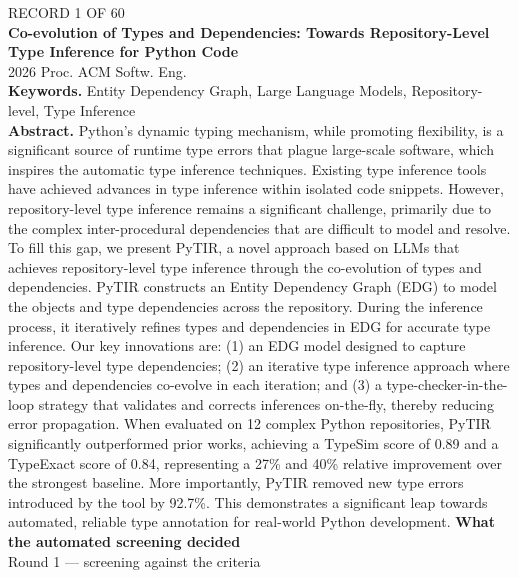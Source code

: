\documentclass[11pt,a4paper]{article}
\begin{document}
{\color{soft}\footnotesize RECORD 1 OF 60}\\[1mm]
{\large\bfseries Co-evolution of Types and Dependencies: Towards Repository-Level Type Inference for Python Code}\\[1.5mm]
{\color{soft}\small 2026 \textperiodcentered{} Proc. ACM Softw. Eng.}\\[2mm]
{\small\textbf{Keywords.} Entity Dependency Graph, Large Language Models, Repository-level, Type Inference}\\[2mm]
{\small\textbf{Abstract.} Python's dynamic typing mechanism, while promoting flexibility, is a significant source of runtime type errors that plague large-scale software, which inspires the automatic type inference techniques. Existing type inference tools have achieved advances in type inference within isolated code snippets. However, repository-level type inference remains a significant challenge, primarily due to the complex inter-procedural dependencies that are difficult to model and resolve. To fill this gap, we present PyTIR, a novel approach based on LLMs that achieves repository-level type inference through the co-evolution of types and dependencies. PyTIR constructs an Entity Dependency Graph (EDG) to model the objects and type dependencies across the repository. During the inference process, it iteratively refines types and dependencies in EDG for accurate type inference. Our key innovations are: (1) an EDG model designed to capture repository-level type dependencies; (2) an iterative type inference approach where types and dependencies co-evolve in each iteration; and (3) a type-checker-in-the-loop strategy that validates and corrects inferences on-the-fly, thereby reducing error propagation. When evaluated on 12 complex Python repositories, PyTIR significantly outperformed prior works, achieving a TypeSim score of 0.89 and a TypeExact score of 0.84, representing a 27\% and 40\% relative improvement over the strongest baseline. More importantly, PyTIR removed new type errors introduced by the tool by 92.7\%. This demonstrates a significant leap towards automated, reliable type annotation for real-world Python development.}
\vspace{3mm}
\vspace{2.5mm}
{\small\textbf{What the automated screening decided}}\\[2mm]
{\footnotesize\color{soft}Round 1 --- screening against the criteria}\\[0.5mm]
\end{document}

